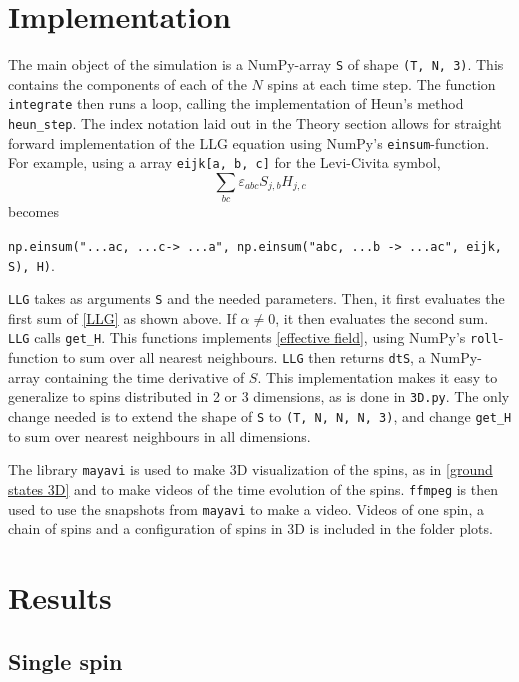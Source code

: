 \documentclass{article}
\begin{document}
    \section*{Implementation}
    The main object of the simulation is a NumPy-array \verb|S| of shape \verb|(T, N, 3)|. This contains the components of each of the $N$ spins at each time step. The function \verb|integrate| then runs a loop, calling the implementation of Heun's method \verb|heun_step|. The index notation laid out in the Theory section allows for straight forward implementation of the LLG equation using NumPy's \verb|einsum|-function. For example, using a array \verb|eijk[a, b, c]| for the Levi-Civita symbol, 
    $$
    \sum_{b c}\varepsilon_{abc}S_{j, b}H_{j,c}
    $$
    becomes
    \begin{center}
        \verb|np.einsum("...ac, ...c-> ...a", np.einsum("abc, ...b -> ...ac", eijk, S), H)|.        
    \end{center}

    \verb|LLG| takes as arguments \verb|S| and the needed parameters. Then, it first evaluates the first sum of \eqref{LLG} as shown above. If $\alpha \neq 0$, it then evaluates the second sum. \verb|LLG| calls \verb|get_H|. This functions implements \eqref{effective field}, using NumPy's \verb|roll|-function to sum over all nearest neighbours. \verb|LLG| then returns \verb|dtS|, a NumPy-array containing the time derivative of $S$. This implementation makes it easy to generalize to spins distributed in 2 or 3 dimensions, as is done in \verb|3D.py|. The only change needed is to extend the shape of \verb|S| to \verb|(T, N, N, N, 3)|, and change \verb|get_H| to sum over nearest neighbours in all dimensions.

    The library \verb|mayavi| is used to make 3D visualization of the spins, as in \autoref{ground states 3D} and to make videos of the time evolution of the spins. \verb|ffmpeg| is then used to use the snapshots from \verb|mayavi| to make a video. Videos of one spin, a chain of spins and a configuration of spins in 3D is included in the folder plots. 


    \section*{Results}
    \subsection*{Single spin}
\end{document}
